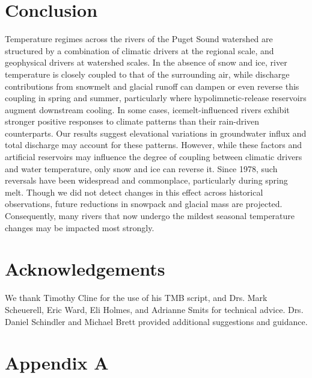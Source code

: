 \documentclass[notitlepage]{article}
\begin{document}
\section*{Conclusion}

Temperature regimes across the rivers of the Puget Sound watershed are structured by a combination of climatic drivers at the regional scale, and geophysical drivers at watershed scales. In the absence of snow and ice, river temperature is closely coupled to that of the surrounding air, while discharge contributions from snowmelt and glacial runoff can dampen or even reverse this coupling in spring and summer, particularly where hypolimnetic-release reservoirs augment downstream cooling. In some cases, icemelt-influenced rivers exhibit stronger positive responses to climate patterns than their rain-driven counterparts. Our results suggest elevational variations in groundwater influx and total discharge may account for these patterns. However, while these factors and artificial reservoirs may influence the degree of coupling between climatic drivers and water temperature, only snow and ice can reverse it. Since 1978, such reversals have been widespread and commonplace, particularly during spring melt. Though we did not detect changes in this effect across historical observations, future reductions in snowpack and glacial mass are projected. Consequently, many rivers that now undergo the mildest seasonal temperature changes may be impacted most strongly.
\clearpage

\section*{Acknowledgements}
We thank Timothy Cline for the use of his TMB script, and Drs. Mark Scheuerell, Eric Ward, Eli Holmes, and Adrianne Smits for technical advice. Drs. Daniel Schindler and Michael Brett provided additional suggestions and guidance.



\clearpage

\section*{Appendix A}
\end{document}

